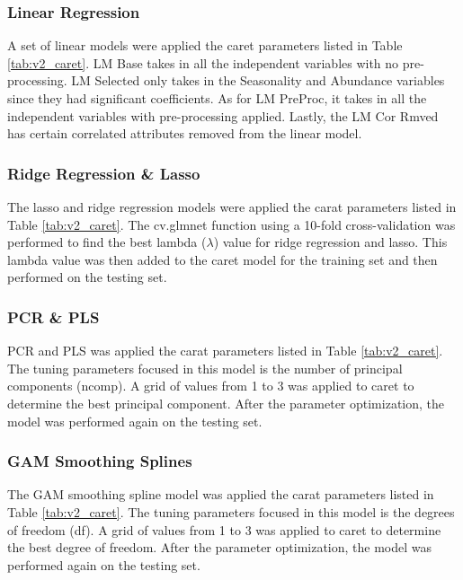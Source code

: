 \documentclass[stu, floatsintext, 11pt]{apa7}
\begin{document}
\subsubsection{Linear Regression}
A set of linear models were applied the caret parameters listed in Table \ref{tab:v2_caret}. LM Base takes in all the independent variables with no pre-processing. LM Selected only takes in the Seasonality and Abundance variables since they had significant coefficients. As for LM PreProc, it takes in all the independent variables with pre-processing applied. Lastly, the LM Cor Rmved has certain correlated attributes removed from the linear model.

\subsubsection{Ridge Regression  \& Lasso}
The lasso and ridge regression models were applied the carat parameters listed in Table \ref{tab:v2_caret}. The cv.glmnet function using a 10-fold cross-validation was performed to find the best lambda ($\lambda$) value for ridge regression and lasso. This lambda value was then added to the caret model for the training set and then performed on the testing set.

\subsubsection{PCR \& PLS}
PCR and PLS was applied the carat parameters listed in Table \ref{tab:v2_caret}. The tuning parameters focused in this model is the number of principal components (ncomp). A grid of values from 1 to 3 was applied to caret to determine the best principal component. After the parameter optimization, the model was performed again on the testing set.

\subsubsection{GAM Smoothing Splines}
The GAM smoothing spline model was applied the carat parameters listed in Table \ref{tab:v2_caret}. The tuning parameters focused in this model is the degrees of freedom (df). A grid of values from 1 to 3 was applied to caret to determine the best degree of freedom. After the parameter optimization, the model was performed again on the testing set.
\end{document}
